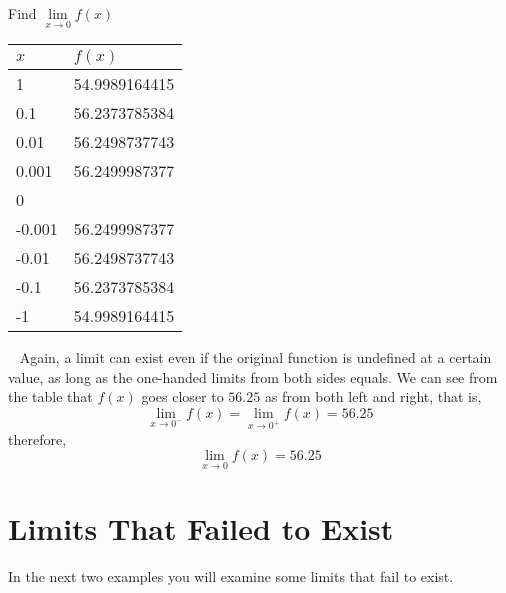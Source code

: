 \begin{example}
	Find $\displaystyle\lim\limits_{x\to 0} f(x)$
    ~\newline
    \begin{table}[H]
        \centering
        \begin{tabular}{l l}
            \toprule
            \textbf{$x$} & \textbf{$f(x)$} \\
            \midrule
            1       &   54.9989164415   \\
            0.1 	&  56.2373785384 	\\
            0.01 	&  56.2498737743 	\\
            0.001 	&  56.2499987377 	\\
            0 		&  \text{undefined} \\
            -0.001	&  56.2499987377	\\
            -0.01	&  56.2498737743 	\\
            -0.1	&  56.2373785384 	\\
            -1      &   54.9989164415   \\
            \bottomrule
        \end{tabular}
    \end{table}
	\begin{solution}~\newline
        Again, a limit can exist even if the original function is undefined at a certain value, as long as the one-handed limits from both sides equals. We can see from the table that $f(x)$ goes closer to $56.25$ as from both left and right, that is,
        $$\displaystyle\lim\limits_{x\to 0^-}f(x) = \displaystyle\lim\limits_{x\to 0^+}f(x) = 56.25$$ 
        therefore, 
        $$\displaystyle\lim\limits_{x\to 0} f(x) = 56.25$$
	\end{solution}
\end{example}

\section{Limits That Failed to Exist}
In the next two examples you will examine some limits that fail to exist.

